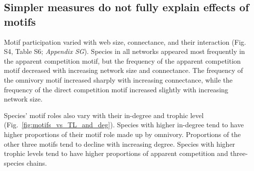 \documentclass[12pt]{article}
\begin{document}
\begin{spacing}{2.0}
    
    \clearpage
    
    \subsection*{Simpler measures do not fully explain effects of motifs}

        Motif participation varied with web size, connectance, and their interaction (Fig. S4, Table S6; \emph{Appendix SG}).
        Species in all networks appeared most frequently in the apparent competition motif, but the frequency of the apparent competition motif decreased with increasing network size and connectance.
        The frequency of the omnivory motif increased sharply with increasing connectance, while the frequency of the direct competition motif increased slightly with increasing network size. 
        
        Species' motif roles also vary with their in-degree and trophic level (Fig.~\ref{fig:motifs_vs_TL_and_deg}).
        Species with higher in-degree tend to have higher proportions of their motif role made up by omnivory. Proportions of the other three motifs tend to decline with increasing degree.
        Species with higher trophic levels tend to have higher proportions of apparent competition and three-species chains. 
        


\end{spacing}
\end{document}
